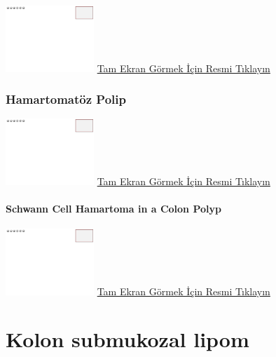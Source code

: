 \documentclass[
  letterpaper,
  DIV=11,
  numbers=noendperiod]{scrreprt}
\begin{document}
\href{https://images.patolojiatlasi.com/template/HE.html}{\includegraphics[width=0.25\textwidth,height=\textheight]{./screenshots/template_screenshot.png}}
\href{https://images.patolojiatlasi.com/hyperplasticpolyp/case1.html}{Tam
Ekran Görmek İçin Resmi Tıklayın}

\hypertarget{sec-kolon-hamartomatoz-polip}{%
\subsection{Hamartomatöz Polip}\label{sec-kolon-hamartomatoz-polip}}

\href{https://images.patolojiatlasi.com/template/HE.html}{\includegraphics[width=0.25\textwidth,height=\textheight]{./screenshots/template_screenshot.png}}
\href{https://images.patolojiatlasi.com/hamartomatouspolyp/HE.html}{Tam
Ekran Görmek İçin Resmi Tıklayın}

\hypertarget{sec-colon-schwann-cell-hamartoma}{%
\subsubsection{Schwann Cell Hamartoma in a Colon
Polyp}\label{sec-colon-schwann-cell-hamartoma}}

\href{https://images.patolojiatlasi.com/template/HE.html}{\includegraphics[width=0.25\textwidth,height=\textheight]{./screenshots/template_screenshot.png}}
\href{https://images.patolojiatlasi.com/schwanncellhamartoma/HE.html}{Tam
Ekran Görmek İçin Resmi Tıklayın}

\hypertarget{sec-kolon-intramukozal-lipom}{%
\chapter{Kolon submukozal lipom}\label{sec-kolon-intramukozal-lipom}}
\end{document}
